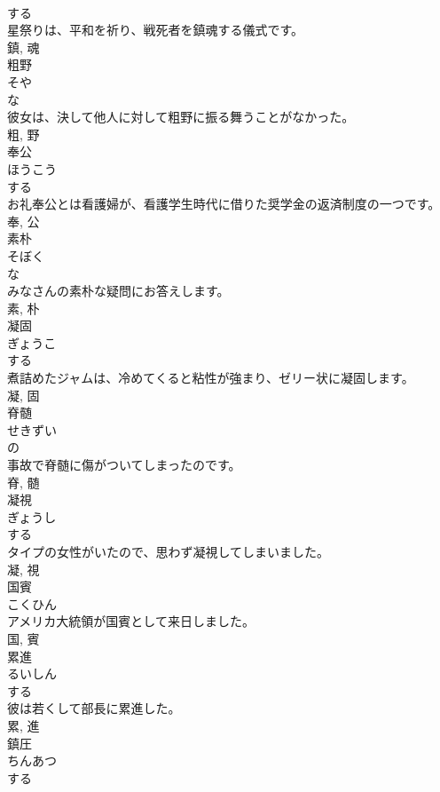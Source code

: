 \documentclass[8pt]{extreport}
\begin{document}
\begin{CJK}{UTF8}{min}
\\	する 
\\	星祭りは、平和を祈り、戦死者を鎮魂する儀式です。	
\\	鎮, 魂	
\\	粗野	
\\	そや	
\\	な 
\\	彼女は、決して他人に対して粗野に振る舞うことがなかった。	
\\	粗, 野	
\\	奉公	
\\	ほうこう	
\\	する 
\\	お礼奉公とは看護婦が、看護学生時代に借りた奨学金の返済制度の一つです。	
\\	奉, 公	
\\	素朴	
\\	そぼく	
\\	な 
\\	みなさんの素朴な疑問にお答えします。	
\\	素, 朴	
\\	凝固	
\\	ぎょうこ	
\\	する 
\\	煮詰めたジャムは、冷めてくると粘性が強まり、ゼリー状に凝固します。	
\\	凝, 固	
\\	脊髄	
\\	せきずい	
\\	の 
\\	事故で脊髄に傷がついてしまったのです。	
\\	脊, 髄	
\\	凝視	
\\	ぎょうし	
\\	する 
\\	タイプの女性がいたので、思わず凝視してしまいました。	
\\	凝, 視	
\\	国賓	
\\	こくひん	
\\	アメリカ大統領が国賓として来日しました。	
\\	国, 賓	
\\	累進	
\\	るいしん	
\\	する 
\\	彼は若くして部長に累進した。	
\\	累, 進	
\\	鎮圧	
\\	ちんあつ	
\\	する 

\end{CJK}
\end{document}
